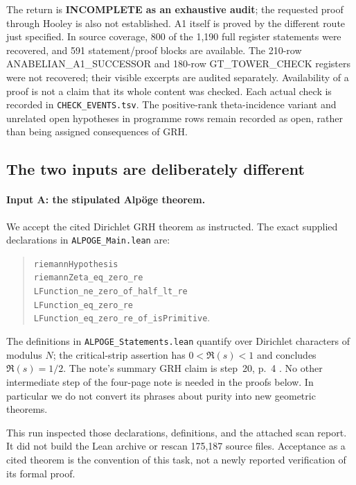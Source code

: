 \documentclass[11pt,a4paper]{article}
\begin{document}
The return is \textbf{INCOMPLETE as an exhaustive audit}; the
requested proof through Hooley is also not established. A1 itself
is proved by the different route just specified. In source coverage,
800 of the 1,190 full register statements were recovered, and 591
statement/proof blocks are available. The 210-row
ANABELIAN\_A1\_SUCCESSOR and 180-row GT\_TOWER\_CHECK registers were not
recovered; their visible excerpts are audited separately. Availability
of a proof is not a claim that its whole content was checked. Each
actual check is recorded in \texttt{CHECK\_EVENTS.tsv}. The positive-rank
theta-incidence variant and unrelated open hypotheses in programme
rows remain recorded as open, rather than being assigned consequences
of GRH.

\subsection{The two inputs are deliberately different}

\paragraph{Input A: the stipulated Alp\"oge theorem.}
We accept the cited Dirichlet GRH theorem as instructed. The exact
supplied declarations in \texttt{ALPOGE\_Main.lean} are:
\begin{quote}\small\raggedright
\texttt{riemannHypothesis}\\
\texttt{riemannZeta\_eq\_zero\_re}\\
\texttt{LFunction\_ne\_zero\_of\_half\_lt\_re}\\
\texttt{LFunction\_eq\_zero\_re}\\
\texttt{LFunction\_eq\_zero\_re\_of\_isPrimitive}.
\end{quote}
The definitions in \texttt{ALPOGE\_Statements.lean} quantify over
Dirichlet characters of modulus $N$; the critical-strip assertion
has $0<\Re(s)<1$ and concludes $\Re(s)=1/2$.
The note's summary GRH claim is step~20, p.~4 \cite{Alpoge}.
No other intermediate step of the four-page note is needed in the
proofs below. In particular we do not convert its phrases about
purity into new geometric theorems.

This run inspected those declarations, definitions, and the attached
scan report. It did not build the Lean archive or rescan 175,187
source files. Acceptance as a cited theorem is the convention of
this task, not a newly reported verification of its formal proof.
\end{document}
